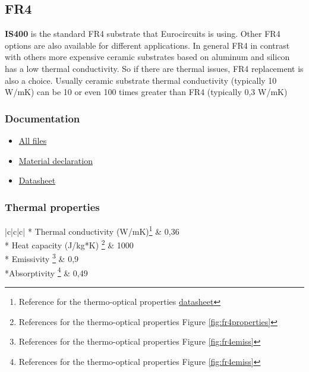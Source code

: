 \documentclass[final]{cubedoc}
\begin{document}
	\pagebreak
	
	\subsection{FR4}
	
	\textbf{IS400} is the standard FR4 substrate that Eurocircuits is using. Other FR4 options are also available for different applications. In general FR4 in contrast with others more expensive ceramic substrates based on aluminum and silicon has a low thermal conductivity. So if there are thermal issues, FR4 replacement is also a choice. Usually ceramic substrate thermal conductivity (typically 10 W/mK) can be 10 or even 100 times greater than FR4 (typically 0,3 W/mK) \cite{zotero-57, zotero-56}
	
	\subsubsection{Documentation}
	
	\begin{itemize}
		\item \href{https://www.isola-group.com/products/all-printed-circuit-materials/is400/}{All files}
		\item \href{https://web.archive.org/web/20200818140037/https://www.isola-group.com/wp-content/uploads/IS400MaterialDeclaration2007.pdf}{Material declaration}
		\item \href{https://web.archive.org/web/20200818140113/https://www.isola-group.com/wp-content/uploads/data-sheets/is400.pdf?v=1585950502}{Datasheet}
	\end{itemize}
	
	
	\subsubsection{Thermal properties}
	
	\begin{center}
		\tablehead{\hline}
		\tabletail{\hline}
		\begin{mpsupertabular}{|c|c|c|}
			 {*} {Thermal conductivity (W/mK)\footnote{Reference for the thermo-optical properties \href{https://web.archive.org/web/20200818140113/https://www.isola-group.com/wp-content/uploads/data-sheets/is400.pdf?v=1585950502}{datasheet}}} & 0,36 \\  
			\hline
			 {*} {Heat capacity (J/kg*K) \footnote{References for the thermo-optical properties Figure \ref{fig:fr4properties}}} & 1000 \\ 
			\hline
			 {*} {Emissivity  \footnote{References for the thermo-optical properties Figure \ref{fig:fr4emiss}}} & 0,9  \\
			\hline
			 {*}{Absorptivity  \footnote{References for the thermo-optical properties Figure \ref{fig:fr4emiss}}} & 0,49 \\
			\hline
		\end{mpsupertabular}
	\end{center}
	
\end{document}
